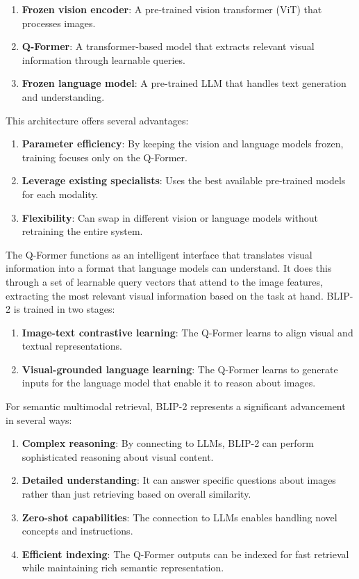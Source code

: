 \documentclass[conference]{IEEEtran}
\begin{document}
\begin{enumerate}
\begin{enumerate}
    \item \textbf{Frozen vision encoder}: A pre-trained vision transformer (ViT) that processes images.
    \item \textbf{Q-Former}: A transformer-based model that extracts relevant visual information through learnable queries.
    \item \textbf{Frozen language model}: A pre-trained LLM that handles text generation and understanding.
\end{enumerate}

This architecture offers several advantages:

\begin{enumerate}
    \item \textbf{Parameter efficiency}: By keeping the vision and language models frozen, training focuses only on the Q-Former.
    \item \textbf{Leverage existing specialists}: Uses the best available pre-trained models for each modality.
    \item \textbf{Flexibility}: Can swap in different vision or language models without retraining the entire system.
\end{enumerate}

The Q-Former functions as an intelligent interface that translates visual information into a format that language models can understand. It does this through a set of learnable query vectors that attend to the image features, extracting the most relevant visual information based on the task at hand.
BLIP-2 is trained in two stages:

\begin{enumerate}
    \item \textbf{Image-text contrastive learning}: The Q-Former learns to align visual and textual representations.
    \item \textbf{Visual-grounded language learning}: The Q-Former learns to generate inputs for the language model that enable it to reason about images.
\end{enumerate}

For semantic multimodal retrieval, BLIP-2 represents a significant advancement in several ways:

\begin{enumerate}
    \item \textbf{Complex reasoning}: By connecting to LLMs, BLIP-2 can perform sophisticated reasoning about visual content.
    \item \textbf{Detailed understanding}: It can answer specific questions about images rather than just retrieving based on overall similarity.
    \item \textbf{Zero-shot capabilities}: The connection to LLMs enables handling novel concepts and instructions.
    \item \textbf{Efficient indexing}: The Q-Former outputs can be indexed for fast retrieval while maintaining rich semantic representation.
\end{enumerate}


\end{enumerate}
\end{document}
